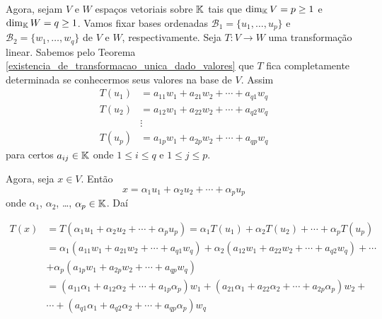 Agora, sejam $V$ e $W$ espaços vetoriais sobre $\mathbb{K}$ tais que $\dim_{\mathbb{K}}V = p \ge 1$ e $\dim_{\mathbb{K}} W = q \ge 1$. Vamos fixar bases ordenadas $\mathcal{B}_1 = \{u_1,\dots,u_p\}$ e $\mathcal{B}_2 = \{w_1,\dots,w_q\}$ de $V$ e $W$, respectivamente. Seja $T \colon V \to W$ uma transformação linear. Sabemos pelo Teorema \ref{existencia_de_transformacao_unica_dado_valores} que $T$ fica completamente determinada se conhecermos seus valores na base de $V$. Assim
\begin{align*}
    T(u_1) &= a_{11}w_1 + a_{21}w_2 + \cdots + a_{q1}w_q\\
    T(u_2) &= a_{12}w_1 + a_{22}w_2 + \cdots + a_{q2}w_q\\
    &\vdots\\
    T(u_p) &= a_{1p}w_1 + a_{2p}w_2 + \cdots + a_{qp}w_q
\end{align*}
para certos $a_{ij} \in \mathbb{K}$ onde $1 \le i \le q$ e $1 \le j \le p$.

Agora, seja $x \in V$. Então
\[
    x = \alpha_1u_1 + \alpha_2u_2 + \cdots + \alpha_pu_p
\]
onde $\alpha_1$, $\alpha_2$, \dots, $\alpha_p \in \mathbb{K}$. Daí

\begin{align*}
    T(x) &= T(\alpha_1u_1 + \alpha_2u_2 + \cdots + \alpha_pu_p) = \alpha_1T(u_1) + \alpha_2T(u_2) + \cdots + \alpha_pT(u_p)\\
    &= \alpha_1(a_{11}w_1 + a_{21}w_2 + \cdots + a_{q1}w_q) + \alpha_2(a_{12}w_1 + a_{22}w_2 + \cdots + a_{q2}w_q) + \cdots \\
    &+ \alpha_p(a_{1p}w_1 + a_{2p}w_2 + \cdots + a_{qp}w_q)\\
    &= (a_{11}\alpha_1 + a_{12}\alpha_2 + \cdots + a_{1p}\alpha_p)w_1 + (a_{21}\alpha_1 + a_{22}\alpha_2 + \cdots + a_{2p}\alpha_p)w_2 + \\ &\cdots + (a_{q1}\alpha_1 + a_{q2}\alpha_2 + \cdots + a_{qp}\alpha_p)w_q\\
\end{align*}

